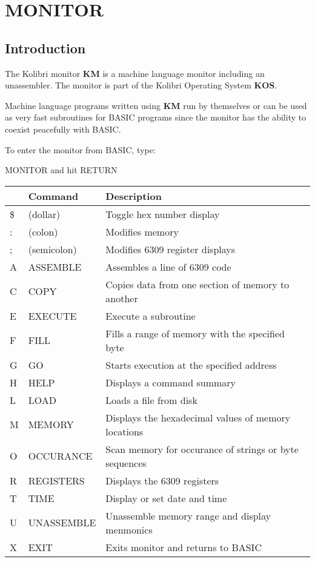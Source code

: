 \chapter{MONITOR}

\section{Introduction}

The Kolibri monitor {\bf KM} is a machine language monitor including
an unassembler. The monitor
is part of the Kolibri Operating System {\bf KOS}.

Machine language programs written using {\bf KM} run by themselves
or can be used as very fast subroutines for BASIC programs since the
monitor has the ability to coexist peacefully with BASIC.

To enter the monitor from BASIC, type:

MONITOR and hit RETURN

\begin{tabular}{|l|l|p{5cm}|}
\hline
  & Command     & Description\\
\hline
\$& (dollar)    & Toggle hex number display \\
: & (colon)     & Modifies memory\\
; & (semicolon) & Modifies 6309 register displays\\
A & ASSEMBLE    & Assembles a line of 6309 code\\
C & COPY        & Copies data from one section of memory to another\\
E & EXECUTE     & Execute a subroutine\\
F & FILL        & Fills a range of memory with the specified byte\\
G & GO          & Starts execution at the specified address\\
H & HELP        & Displays a command summary\\
L & LOAD        & Loads a file from disk\\
M & MEMORY      & Displays the hexadecimal values of memory locations\\
O & OCCURANCE   & Scan memory for occurance of strings or byte sequences\\
R & REGISTERS   & Displays the 6309 registers\\
T & TIME        & Display or set date and time\\
U & UNASSEMBLE  & Unassemble memory range and display menmonics\\
X & EXIT        & Exits monitor and returns to BASIC\\
\hline
\end{tabular}

